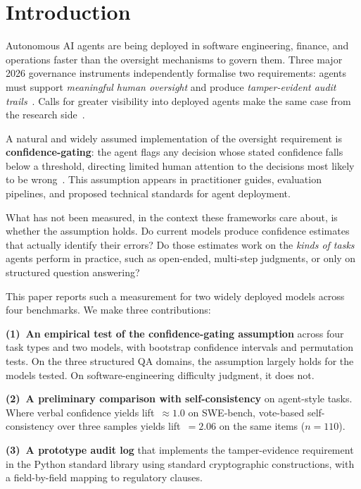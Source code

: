\documentclass[10pt,twocolumn]{article}
\begin{document}
\section{Introduction}

Autonomous AI agents are being deployed in software engineering, finance, and
operations faster than the oversight mechanisms to govern them. Three major 2026
governance instruments independently formalise two requirements: agents must
support \emph{meaningful human oversight} and produce \emph{tamper-evident audit
trails}~\citep{imda2026,nist2026,euaiact2024}. Calls for greater visibility into
deployed agents make the same case from the research
side~\citep{chan2024}.

A natural and widely assumed implementation of the oversight requirement is
\textbf{confidence-gating}: the agent flags any decision whose stated confidence
falls below a threshold, directing limited human attention to the decisions most
likely to be wrong~\citep{galileo2026,parasuraman2010}. This assumption appears
in practitioner guides, evaluation pipelines, and proposed technical
standards for agent deployment.

What has not been measured, in the context these frameworks care about, is
whether the assumption holds. Do current models produce confidence estimates that
actually identify their errors? Do those estimates work on the \emph{kinds of
tasks} agents perform in practice, such as open-ended, multi-step judgments, or
only on structured question answering?

This paper reports such a measurement for two widely deployed models across
four benchmarks. We make three contributions:

\textbf{(1)~An empirical test of the confidence-gating assumption} across four
task types and two models, with bootstrap confidence intervals and permutation
tests. On the three structured QA domains, the assumption largely holds for the
models tested. On software-engineering difficulty judgment, it does not.

\textbf{(2)~A preliminary comparison with self-consistency} on agent-style
tasks. Where verbal confidence yields lift~$\approx1.0$ on SWE-bench,
vote-based self-consistency over three samples yields lift~$=2.06$ on the same
items ($n{=}110$).

\textbf{(3)~A prototype audit log} that implements the tamper-evidence
requirement in the Python standard library using standard cryptographic
constructions, with a field-by-field mapping to regulatory clauses.
\end{document}
